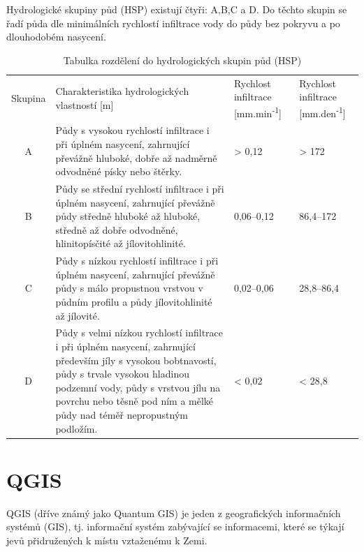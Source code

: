 \documentclass[a4paper,oneside,12pt]{book}
\begin{document}
\hspace{10mm} Hydrologické skupiny půd (HSP) existují čtyři: A,B,C a D. Do těchto skupin se řadí půda dle minimálních rychlostí infiltrace vody do půdy bez pokryvu a po dlouhodobém nasycení.\cite{MNYDGwleJOjKdRUp}
\begin{table}[htbp]
  \centering
  \caption{Tabulka rozdělení do hydrologických skupin půd (HSP) \cite{MNYDGwleJOjKdRUp}} 
  \label{tab:HSP}
  \begin{tabular}{|c|p{6cm}|p{2.5cm}|p{2.5cm}|}
    \hline
    Skupina & Charakteristika hydrologických vlastností [m] & 
    Rychlost infiltrace [mm.min\textsuperscript{-1}] & Rychlost infiltrace [mm.den\textsuperscript{-1}] \\
    \hhline{=|=|=|=|}
    A & Půdy s vysokou rychlostí infiltrace i při úplném nasycení, zahrnující převážně hluboké, dobře až nadměrně odvodněné písky nebo štěrky. & > 0,12 & > 172 \\
    \hline
    B & Půdy se střední rychlostí infiltrace i při úplném nasycení, zahrnující převážně půdy středně hluboké až hluboké, středně až dobře odvodněné, hlinitopísčité až jílovitohlinité. & 0,06–0,12 & 86,4–172 \\
    \hline
    C & Půdy s nízkou rychlostí infiltrace i při úplném nasycení, zahrnující převážně půdy s málo propustnou vrstvou v půdním profilu a půdy jílovitohlinité až jílovité. & 0,02–0,06 & 28,8–86,4 \\
    \hline
    D & Půdy s velmi nízkou rychlostí infiltrace i při úplném nasycení, zahrnující především jíly s vysokou bobtnavostí, půdy s trvale vysokou hladinou podzemní vody, půdy s vrstvou jílu na povrchu nebo těsně pod ním a mělké půdy nad téměř nepropustným podložím. & < 0,02 & < 28,8 \\
    \hline
  \end{tabular}
  
\end{table}

\newpage
\section{QGIS} \label{qgis}
\hspace{10mm} QGIS (dříve známý jako Quantum GIS) je jeden z geografických informačních systémů (GIS), tj.  informační systém zabývající se informacemi, které se týkají jevů přidružených k místu vztaženému k Zemi. \cite{dONaeOjXanl1W2md}
\end{document}
